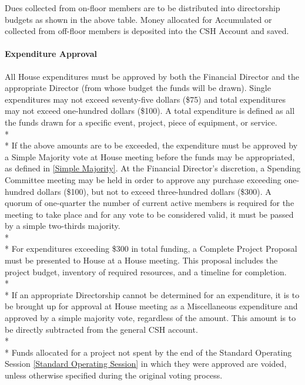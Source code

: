 \documentclass{article}
\newcommand{\asubsubsection}[1]{\paragraph{#1} \label{#1}}
\begin{document}

Dues collected from on-floor members are to be distributed into directorship budgets as shown in the above table.
Money allocated for Accumulated or collected from off-floor members is deposited into the CSH Account and saved.

\asubsubsection{Expenditure Approval}
All House expenditures must be approved by both the Financial Director and the appropriate Director (from whose budget the funds will be drawn).
Single expenditures may not exceed seventy-five dollars (\$75) and total expenditures may not exceed one-hundred dollars (\$100).
A total expenditure is defined as all the funds drawn for a specific event, project, piece of equipment, or service.
\\* \\*
If the above amounts are to be exceeded, the expenditure must be approved by a Simple Majority vote at House meeting before the funds may be appropriated, as defined in \ref{Simple Majority}.
At the Financial Director's discretion, a Spending Committee meeting may be held in order to approve any purchase exceeding one-hundred dollars (\$100), but not to exceed three-hundred dollars (\$300).
A quorum of one-quarter the number of current active members is required for the meeting to take place and for any vote to be considered valid, it must be passed by a simple two-thirds majority.
\\*\\*
For expenditures exceeding \$300 in total funding, a Complete Project Proposal must be presented to House at a House meeting.
This proposal includes the project budget, inventory of required resources, and a timeline for completion.
\\* \\*
If an appropriate Directorship cannot be determined for an expenditure, it is to be brought up for approval at House meeting as a Miscellaneous expenditure and approved by a simple majority vote, regardless of the amount.
This amount is to be directly subtracted from the general CSH account.
\\* \\*
Funds allocated for a project not spent by the end of the Standard Operating Session \ref{Standard Operating Session} in which they were approved are voided, unless otherwise specified during the original voting process.
\end{document}
